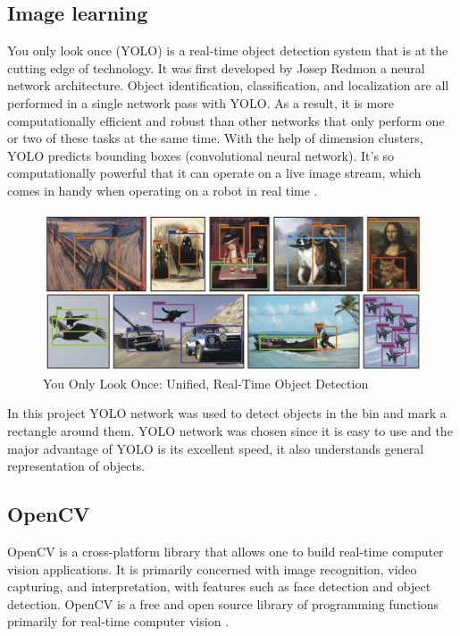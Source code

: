 \subsection{Image learning}
You only look once (YOLO) is a real-time object detection system that is at the cutting edge of technology. It was first developed by Josep Redmon a neural network architecture. Object identification, classification, and localization are all performed in a single network pass with YOLO. As a result, it is more computationally efficient and robust than other networks that only perform one or two of these tasks at the same time. With the help of dimension clusters, YOLO predicts bounding boxes (convolutional neural network). It's so computationally powerful that it can operate on a live image stream, which comes in handy when operating on a robot in real time \cite{redmon_yolov3_2018}.
\begin{figure} [h]
    \centering
    \includegraphics[width = \textwidth]{graphics/yolo.PNG}
    \caption{You Only Look Once: Unified, Real-Time Object Detection \cite{redmon_you_2016}}
    \label{fig:yolo}
\end{figure}

In this project YOLO network was used to detect objects in the bin and mark a rectangle around them. YOLO network was chosen since it is easy to use and the major advantage of YOLO is its excellent speed, it also understands general representation of objects. 


\subsection{OpenCV}
OpenCV is a cross-platform library that allows one to build real-time computer vision applications. It is primarily concerned with image recognition, video capturing, and interpretation, with features such as face detection and object detection. OpenCV is a free and open source library of programming functions primarily for real-time computer vision \cite{noauthor_opencv_nodate}.

